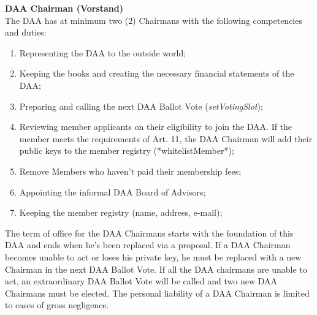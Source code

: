 \item \textbf{DAA Chairman (Vorstand)} \\
The DAA has at minimum two (2) Chairmans with the following competencies and duties:
\begin{enumerate}
    [label=(\alph*)]
    \item Representing the DAA to the outside world;
    \item Keeping the books and creating the necessary financial statements of the DAA;
    \item Preparing and calling the next DAA Ballot Vote (\emph{setVotingSlot});
    \item Reviewing member applicants on their eligibility to join the DAA.
          If the member meets the requirements of Art. 11, the DAA Chairman will add their public keys to the member registry (*whitelistMember*);
    \item Remove Members who haven't paid their membership fees;
    \item Appointing the informal DAA Board of Advisors; %
    \item Keeping the member registry (name, address, e-mail); %
\end{enumerate}
The term of office for the DAA Chairmans starts with the foundation of this DAA and ends when he's been replaced via a proposal.
If a DAA Chairman becomes unable to act or loses his private key, he must be replaced with a new Chairman in the next DAA Ballot Vote.
If all the DAA chairmans are unable to act, an extraordinary DAA Ballot Vote will be called and two new DAA Chairmans must be elected.
The personal liability of a DAA Chairman is limited to cases of gross negligence.

